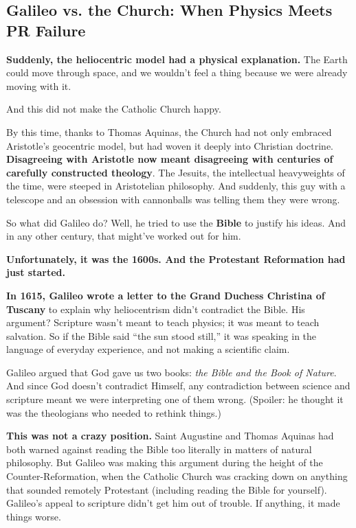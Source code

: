 \subsection{Galileo vs. the Church: When Physics Meets PR Failure}

\textbf{Suddenly, the heliocentric model had a physical explanation.} The Earth could move through space, and we wouldn’t feel a thing because we were already moving with it. 

And this did not make the Catholic Church happy.

By this time, thanks to Thomas Aquinas, the Church had not only embraced Aristotle’s geocentric model, but had woven it deeply into Christian doctrine. \textbf{Disagreeing with Aristotle now meant disagreeing with centuries of carefully constructed theology}. The Jesuits, the intellectual heavyweights of the time, were steeped in Aristotelian philosophy.  And suddenly, this guy with a telescope and an obsession with cannonballs was telling them they were wrong.

So what did Galileo do? Well, he tried to use the \textbf{Bible} to justify his ideas. And in any other century, that might’ve worked out for him.  

\textbf{Unfortunately, it was the 1600s. And the Protestant Reformation had just started.}

\vspace{1em}

\begin{tcolorbox}[colback=blue!5!white, colframe=blue!50!black, title=Historical Sidebar: Galileo and the Bible]

  \textbf{In 1615, Galileo wrote a letter to the Grand Duchess Christina of Tuscany} to explain why heliocentrism didn’t contradict the Bible. His argument? Scripture wasn’t meant to teach physics; it was meant to teach salvation. So if the Bible said “the sun stood still,” it was speaking in the language of everyday experience, and not making a scientific claim. 

  \medskip

  Galileo argued that God gave us two books: \emph{the Bible and the Book of Nature}. And since God doesn’t contradict Himself, any contradiction between science and scripture meant we were interpreting one of them wrong. (Spoiler: he thought it was the theologians who needed to rethink things.)

  \medskip

  \textbf{This was not a crazy position.} Saint Augustine and Thomas Aquinas had both warned against reading the Bible too literally in matters of natural philosophy. But Galileo was making this argument during the height of the Counter-Reformation, when the Catholic Church was cracking down on anything that sounded remotely Protestant (including reading the Bible for yourself). Galileo’s appeal to scripture didn’t get him out of trouble. If anything, it made things worse.

\end{tcolorbox}

